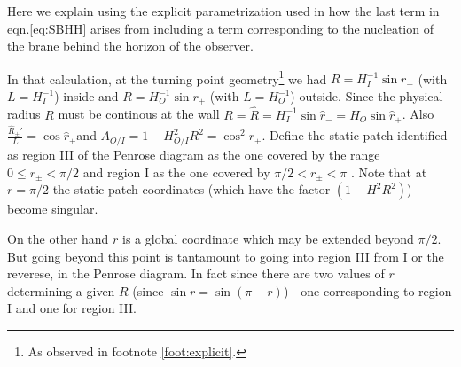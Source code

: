 \documentclass[a4paper,11pt]{article}
\numberwithin{equation}{section}
\numberwithin{equation}{section}
\begin{document}
Here we explain using the explicit parametrization used in  \cite{DeAlwis:2019rxg} how the last term in eqn.\eqref{eq:SBHH}
arises from including a term corresponding to the nucleation of the brane behind the horizon of the observer.

In that calculation, at the turning point geometry\footnote{As observed in footnote \eqref{foot:explicit}.} we had
$R=H_{I}^{-1}\sin r_{-}$ (with $L=H_{I}^{-1}$) inside and $R=H_{O}^{-1}\sin r_{+}$
(with $L=H_{O}^{-1}$) outside. Since the physical radius $R$ must
be continous at the wall $R=\hat{R}=H_{I}^{-1}\sin\hat{r}_{-}=H_{O}\sin\hat{r}_{+}$.
Also $\frac{\ensuremath{\hat{R}_{\pm}'}}{L}=\cos\hat{r}_{\pm}$and
$A_{O/I}=1-H_{O/I}^{2}R^{2}=\cos^{2}r_{\pm}$. Define the static patch
identified as region III of the Penrose diagram as the one covered
by the range $0\le r_{\pm}<\pi/2$ and region I as the one covered
by $\pi/2<r_{\pm}<\pi$ . Note that at $r=\pi/2$ the static patch
coordinates (which have the factor $(1-H^{2}R^{2})$) become singular.

On the other hand $r$ is a global coordinate which may be extended
beyond $\pi/2$. But going beyond this point is tantamount to going
into region III from I or the reverese, in the Penrose diagram. In
fact since there are two values of $r$ determining a given $R$ (since
$\sin r=\sin(\pi-r)$) - one corresponding to region I and one for
region III.
\end{document}
